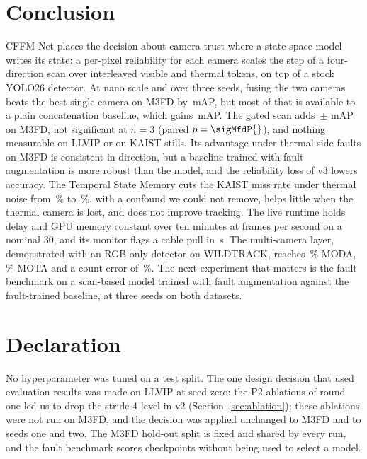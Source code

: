 \section{Conclusion}
\label{sec:conclusion}
CFFM-Net places the decision about camera trust where a state-space model writes its state: a per-pixel reliability for each camera scales the step of a four-direction scan over interleaved visible and thermal tokens, on top of a stock YOLO26 detector. At nano scale and over three seeds, fusing the two cameras beats the best single camera on M3FD by \gainMfdCffmVtwoOverBestMeanMap{}\,mAP, but most of that is available to a plain concatenation baseline, which gains \gainMfdConcatMdOverBestMeanMap{}\,mAP. The gated scan adds \marMfdVtwoVsConcatMdMeanMap{}\,$\pm$\,\marMfdVtwoVsConcatMdStdMap{}\,mAP on M3FD, not significant at $n=3$ (paired $p=\sigMfdP{}$), and nothing measurable on LLVIP or on KAIST stills. Its advantage under thermal-side faults on M3FD is consistent in direction, but a baseline trained with fault augmentation is more robust than the model, and the reliability loss of v3 lowers accuracy. The Temporal State Memory cuts the KAIST miss rate under thermal noise from \memThermalNoiseImageAllMr{}\,\% to \memThermalNoiseMemoryAllMr{}\,\%, with a confound we could not remove, helps little when the thermal camera is lost, and does not improve tracking. The live runtime holds delay and GPU memory constant over ten minutes at \livSoakThirtyFps{} frames per second on a nominal 30, and its monitor flags a cable pull in \livFaultOnUnpluggedDetectS{}\,s. The multi-camera layer, demonstrated with an RGB-only detector on WILDTRACK, reaches \camDetFineTunedModa{}\,\% MODA, \camTrackMota{}\,\% MOTA and a count error of \camCountRelErr{}\,\%. The next experiment that matters is the fault benchmark on a scan-based model trained with fault augmentation against the fault-trained baseline, at three seeds on both datasets.

\section*{Declaration}
No hyperparameter was tuned on a test split. The one design decision that used evaluation results was made on LLVIP at seed zero: the P2 ablations of round one led us to drop the stride-4 level in v2 (Section~\ref{sec:ablation}); these ablations were not run on M3FD, and the decision was applied unchanged to M3FD and to seeds one and two. The M3FD hold-out split is fixed and shared by every run, and the fault benchmark scores checkpoints without being used to select a model.

